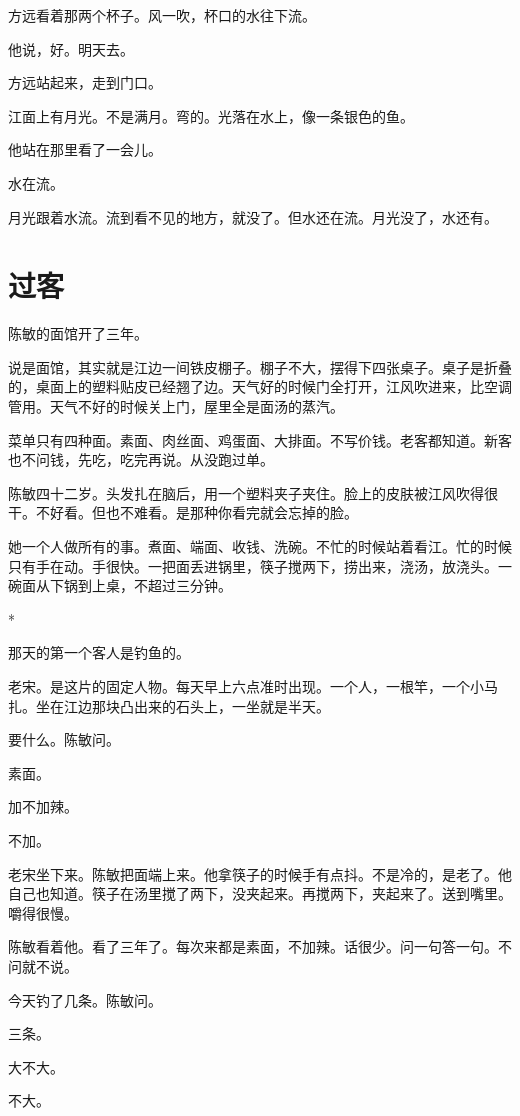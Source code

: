\documentclass[UTF8,a5paper,11pt,openany]{ctexbook}
\newcommand{\scene}{\vspace{1em}\begin{center}*\quad*\quad*\end{center}\vspace{0.5em}}
\begin{document}
方远看着那两个杯子。风一吹，杯口的水往下流。

他说，好。明天去。

方远站起来，走到门口。

江面上有月光。不是满月。弯的。光落在水上，像一条银色的鱼。

他站在那里看了一会儿。

水在流。

月光跟着水流。流到看不见的地方，就没了。但水还在流。月光没了，水还有。

\clearpage

\chapter{过客}
\indent
陈敏的面馆开了三年。

说是面馆，其实就是江边一间铁皮棚子。棚子不大，摆得下四张桌子。桌子是折叠的，桌面上的塑料贴皮已经翘了边。天气好的时候门全打开，江风吹进来，比空调管用。天气不好的时候关上门，屋里全是面汤的蒸汽。

菜单只有四种面。素面、肉丝面、鸡蛋面、大排面。不写价钱。老客都知道。新客也不问钱，先吃，吃完再说。从没跑过单。

陈敏四十二岁。头发扎在脑后，用一个塑料夹子夹住。脸上的皮肤被江风吹得很干。不好看。但也不难看。是那种你看完就会忘掉的脸。

她一个人做所有的事。煮面、端面、收钱、洗碗。不忙的时候站着看江。忙的时候只有手在动。手很快。一把面丢进锅里，筷子搅两下，捞出来，浇汤，放浇头。一碗面从下锅到上桌，不超过三分钟。


\scene

那天的第一个客人是钓鱼的。

老宋。是这片的固定人物。每天早上六点准时出现。一个人，一根竿，一个小马扎。坐在江边那块凸出来的石头上，一坐就是半天。

要什么。陈敏问。

素面。

加不加辣。

不加。

老宋坐下来。陈敏把面端上来。他拿筷子的时候手有点抖。不是冷的，是老了。他自己也知道。筷子在汤里搅了两下，没夹起来。再搅两下，夹起来了。送到嘴里。嚼得很慢。

陈敏看着他。看了三年了。每次来都是素面，不加辣。话很少。问一句答一句。不问就不说。

今天钓了几条。陈敏问。

三条。

大不大。

不大。
\end{document}
